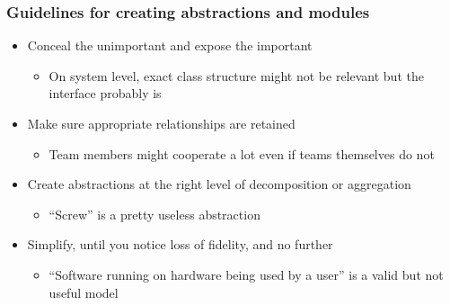 \documentclass[10pt, compress]{beamer}
\begin{document}
\begin{frame}[fragile]
	
	\frametitle{Guidelines for creating abstractions and modules}
		\begin{itemize}
			\item Conceal the unimportant and expose the important
			\begin{itemize}
				\item On system level, exact class structure might not be relevant but the interface probably is
			\end{itemize}
			\item Make sure appropriate relationships are retained
			\begin{itemize}
				\item Team members might cooperate a lot even if teams themselves do not
			\end{itemize}
			\item Create abstractions at the right level of decomposition or aggregation
			\begin{itemize}
				\item \enquote{Screw} is a pretty useless abstraction
			\end{itemize}
			\item Simplify, until you notice loss of fidelity, and no further
			\begin{itemize}
				\item \enquote{Software running on hardware being used by a user} is a valid but not useful model 
			\end{itemize}
		\end{itemize}

\end{frame}
\end{document}
